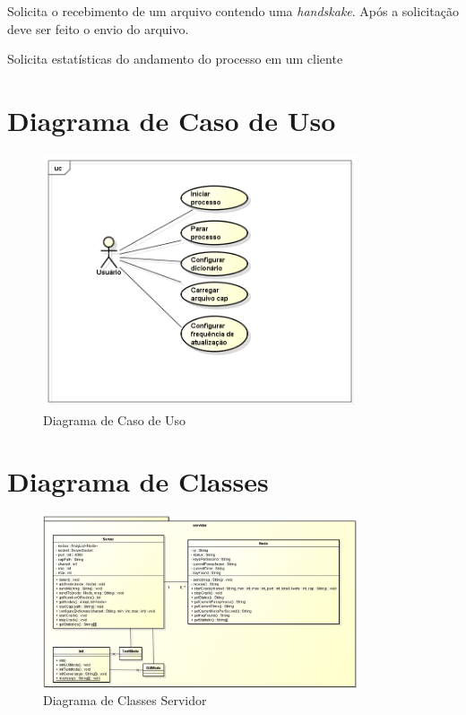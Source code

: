 \documentclass[12pt,a4paper]{abnt}
\begin{document}
		{Solicita o recebimento de um arquivo contendo uma \emph{handskake}. Após a solicitação deve ser feito o envio do arquivo.}
		{
		}

		{Solicita estatísticas do andamento do processo em um cliente}
		{
		}

		\clearpage
		\section{Diagrama de Caso de Uso}

		\begin{figure}[htp]
			\begin{center}
			  \includegraphics[width=350px]{casoDeUso}
			  \caption{Diagrama de Caso de Uso}
			  \label{fig:casoDeUso}
			\end{center}
		\end{figure}
		\FloatBarrier

		\clearpage
		\section{Diagrama de Classes}

			\begin{figure}[htp]
				\begin{center}
				  \includegraphics[width=350px]{diagramaClassesServidor}
				  \caption{Diagrama de Classes Servidor}
				  \label{fig:diagramaClassesServidor}
				\end{center}
			\end{figure}
\end{document}
